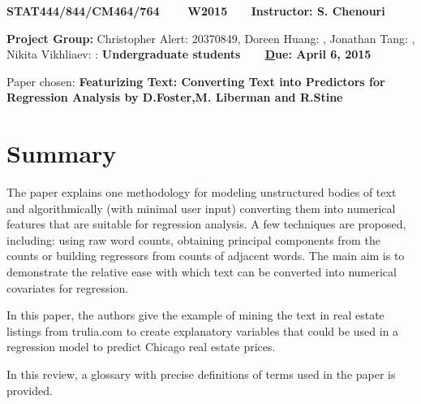 \documentclass[11pt]{report}
\begin{document}
\begin{center}
{\bf STAT444/844/CM464/764 ~~~ W2015 ~~~Instructor: S. Chenouri}

{\bf Project Group:} Christopher Alert: 20370849, Doreen Huang:  , Jonathan Tang: , Nikita Vikhliaev:  : 
{\bf Undergraduate students} ~~~ {\bf\underline Due: April 6, 2015}\\
\end{center} 
\noindent

\noindent
\begin{center}
Paper chosen: {\bf Featurizing Text: Converting Text into Predictors for Regression Analysis by D.Foster,M. Liberman and R.Stine}
\end{center}

\section* { Summary} 

The paper explains one methodology for modeling unstructured bodies of text and algorithmically (with minimal user input) converting them into numerical features that are suitable for regression analysis. A few techniques are proposed, including: using raw word counts, obtaining principal components from the counts or building regressors from counts of adjacent words. The main aim is to demonstrate the relative ease with which text can be converted into numerical covariates for regression.

In this paper, the authors give the example of mining the text in real estate listings from trulia.com to create explanatory variables that could be used in a regression model to predict Chicago real estate prices.

In this review, a glossary with precise definitions of terms used in the paper is provided.
\end{document}

